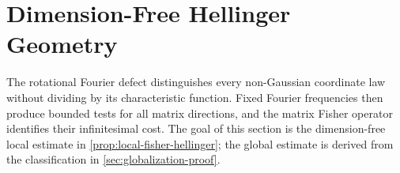 \section{Dimension-Free Hellinger Geometry}
\label{sec:rotational-fourier-defect-and-hellinger-coercivity}

The rotational Fourier defect distinguishes every non-Gaussian coordinate law
without dividing by its characteristic function.  Fixed Fourier frequencies
then produce bounded tests for all matrix directions, and the matrix Fisher
operator identifies their infinitesimal cost.  The goal of this section is the
dimension-free local estimate in
\cref{prop:local-fisher-hellinger}; the global estimate is derived from the
classification in \cref{sec:globalization-proof}.



